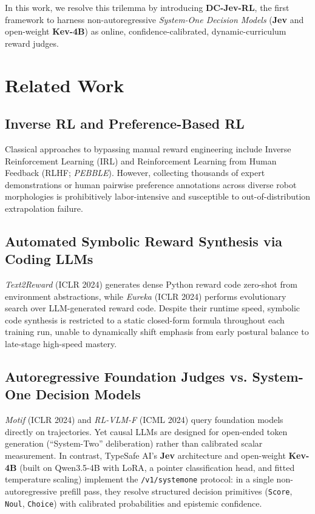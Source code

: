 \documentclass[10pt]{article}
\begin{document}
In this work, we resolve this trilemma by introducing \textbf{DC-Jev-RL}, the first framework to harness non-autoregressive \textit{System-One Decision Models} (\textbf{Jev} and open-weight \textbf{Kev-4B}) as online, confidence-calibrated, dynamic-curriculum reward judges.

\section{Related Work}
\subsection{Inverse RL and Preference-Based RL}
Classical approaches to bypassing manual reward engineering include Inverse Reinforcement Learning (IRL) and Reinforcement Learning from Human Feedback (RLHF; \textit{PEBBLE}). However, collecting thousands of expert demonstrations or human pairwise preference annotations across diverse robot morphologies is prohibitively labor-intensive and susceptible to out-of-distribution extrapolation failure.

\subsection{Automated Symbolic Reward Synthesis via Coding LLMs}
\textit{Text2Reward} (ICLR 2024) generates dense Python reward code zero-shot from environment abstractions, while \textit{Eureka} (ICLR 2024) performs evolutionary search over LLM-generated reward code. Despite their runtime speed, symbolic code synthesis is restricted to a static closed-form formula throughout each training run, unable to dynamically shift emphasis from early postural balance to late-stage high-speed mastery.

\subsection{Autoregressive Foundation Judges vs. System-One Decision Models}
\textit{Motif} (ICLR 2024) and \textit{RL-VLM-F} (ICML 2024) query foundation models directly on trajectories. Yet causal LLMs are designed for open-ended token generation (``System-Two'' deliberation) rather than calibrated scalar measurement. In contrast, TypeSafe AI's \textbf{Jev} architecture and open-weight \textbf{Kev-4B} (built on Qwen3.5-4B with LoRA, a pointer classification head, and fitted temperature scaling) implement the \texttt{/v1/systemone} protocol: in a single non-autoregressive prefill pass, they resolve structured decision primitives (\texttt{Score}, \texttt{Noul}, \texttt{Choice}) with calibrated probabilities and epistemic confidence.
\end{document}
